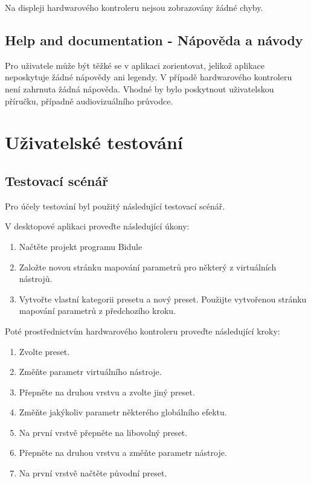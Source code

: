 \documentclass[thesis=M,czech]{FITthesis}[2019/03/06]
\begin{document}
			Na displeji hardwarového kontroleru nejsou zobrazovány žádné chyby.

		\subsection{Help and documentation - Nápověda a návody}
			Pro uživatele může být těžké se v aplikaci zorientovat, jelikož aplikace neposkytuje žádné nápovědy ani legendy. V případě hardwarového kontroleru není zahrnuta žádná nápověda. Vhodné by bylo poskytnout uživatelskou příručku, případně audiovizuálního průvodce.
		
	\section{Uživatelské testování}
		\subsection{Testovací scénář}
			Pro účely testování byl použitý následující testovací scénář.
			
			V desktopové aplikaci proveďte následující úkony:
			\begin{enumerate}
				\item Načtěte projekt programu Bidule
				\item Založte novou stránku mapování parametrů pro některý z virtuálních nástrojů.
				\item Vytvořte vlastní kategorii presetu a nový preset. Použijte vytvořenou stránku mapování parametrů z předchozího kroku.
			\end{enumerate}
				
			Poté prostřednictvím hardwarového kontroleru proveďte následující kroky:
			\begin{enumerate}
				\item Zvolte preset.
				\item Změňte parametr virtuálního nástroje.
				\item Přepněte na druhou vrstvu a zvolte jiný preset.
				\item Změňte jakýkoliv parametr některého globálního efektu.
				\item Na první vrstvě přepněte na libovolný preset.
				\item Přepněte na druhou vrstvu a změňte parametr nástroje.
				\item Na první vrstvě načtěte původní preset.
			\end{enumerate}
		
\end{document}
